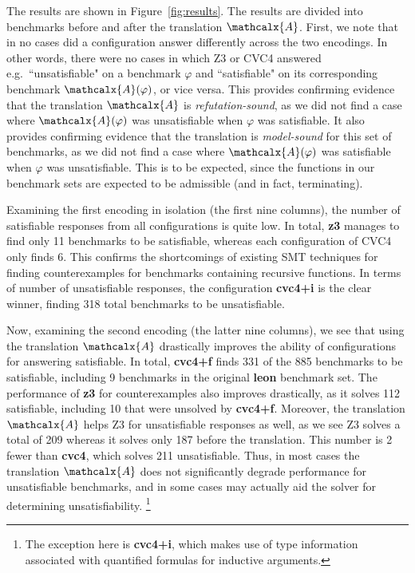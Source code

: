 \documentclass[runningheads,a4paper]{llncs}
\newcommand\cvc{CVC4\xspace}
\newcommand\ziii{Z3\xspace}
\newcommand{\conv}{\mathcalx{A}}
\begin{document}
The results are shown in Figure~\ref{fig:results}.
The results are divided into benchmarks before and after the translation $\conv$.
First, we note that in no cases did a configuration answer differently across the two encodings.
In other words, there were no cases in which \ziii or \cvc answered e.g.\ ``unsatisfiable" on a benchmark $\varphi$
and ``satisfiable" on its corresponding benchmark $\conv( \varphi )$, or vice versa.
This provides confirming evidence that the translation $\conv$ is \emph{refutation-sound},
as we did not find a case where $\conv( \varphi )$ was unsatisfiable when $\varphi$ was satisfiable.
It also provides confirming evidence that the translation is \emph{model-sound} for this set of benchmarks,
as we did not find a case where $\conv( \varphi )$ was satisfiable when $\varphi$ was unsatisfiable.
This is to be expected, since the functions in our benchmark sets are expected to be admissible (and in fact, terminating).

Examining the first encoding in isolation (the first nine columns),
the number of satisfiable responses from all configurations is quite low.
In total, {\bf z3} manages to find only 11 benchmarks to be satisfiable,
whereas each configuration of \cvc only finds 6.
This confirms the shortcomings of existing SMT techniques for finding counterexamples for benchmarks containing recursive functions.
In terms of number of unsatisfiable responses,
the configuration {\bf cvc4+i} is the clear winner, finding 318 total benchmarks to be unsatisfiable.

Now, examining the second encoding (the latter nine columns),
we see that using the translation $\conv$ drastically improves the ability of configurations for answering satisfiable.
In total, {\bf cvc4+f} finds 331 of the 885 benchmarks to be satisfiable, including 9 benchmarks in the original {\bf leon} benchmark set.
The performance of {\bf z3} for counterexamples also improves drastically, as it solves 112 satisfiable,
including 10 that were unsolved by {\bf cvc4+f}.
Moreover, the translation $\conv$ helps \ziii for unsatisfiable responses as well,
as we see \ziii solves a total of 209 whereas it solves only 187 before the translation.
This number is 2 fewer than {\bf cvc4}, which solves 211 unsatisfiable.
Thus, in most cases the translation $\conv$ does not significantly degrade performance for unsatisfiable benchmarks,
and in some cases may actually aid the solver for determining unsatisfiability.%
\footnote{The exception here is {\bf cvc4+i}, which makes use of type
information associated with quantified formulas for inductive arguments.}
\end{document}
